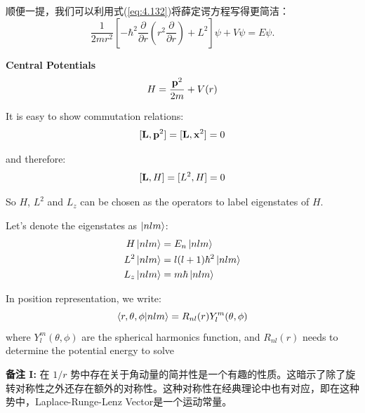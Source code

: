 顺便一提，我们可以利用式(\ref{eq:4.132})将薛定谔方程写得更简洁：
\[
\frac{1}{2mr^2} \left[ -\hbar^2 \frac{\partial}{\partial r}\left( r^2 \frac{\partial}{\partial r} \right) + L^2 \right] \psi + V\psi = E\psi.
\]

\textbf{Central Potentials}
\[
H = \frac{\vb{p}^2}{2m} + V(r)
\]

It is easy to show commutation relations:
\[
[\vb{L}, \vb{p}^2] = [\vb{L}, \vb{x}^2] = 0
\]

and therefore:
\[
[\vb{L}, H] = [L^2, H] = 0
\]

So $H$, $L^2$ and $L_z$ can be chosen as the operators to label eigenstates of $H$.

Let's denote the eigenstates as $\ket{nlm}$:
\begin{align}
	H\ket{nlm} &= E_n \ket{nlm} \\
	L^2\ket{nlm} &= l(l+1)\hbar^2 \ket{nlm} \\
	L_z\ket{nlm} &= m\hbar \ket{nlm}
\end{align}

In position representation, we write:
\[
\braket{r,\theta,\phi}{nlm} = R_{nl}(r) Y_l^m(\theta, \phi)
\]
where $Y_l^m(\theta, \phi)$ are the spherical harmonics function, and $R_{nl}(r)$ needs to determine the potential energy to solve
\vspace{0.5cm}  %

\noindent \textbf{备注 I:} 在 $1/r$ 势中存在关于角动量的简并性是一个有趣的性质。这暗示了除了旋转对称性之外还存在额外的对称性。这种对称性在经典理论中也有对应，即在这种势中，Laplace-Runge-Lenz Vector是一个运动常量。
